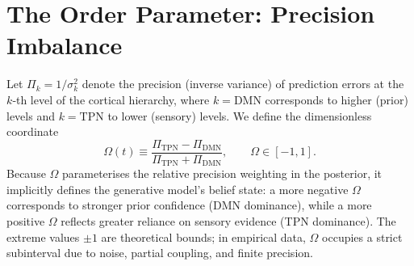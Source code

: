 \documentclass[11pt]{article}
\begin{document}
\section{The Order Parameter: Precision Imbalance}
Let $\Pi_k = 1/\sigma_k^2$ denote the precision (inverse variance) of prediction errors at the $k$‑th level of the cortical hierarchy, where $k=\text{DMN}$ corresponds to higher (prior) levels and $k=\text{TPN}$ to lower (sensory) levels. We define the dimensionless coordinate
\begin{equation}\label{eq:Omega}
\Omega(t) \equiv \frac{\Pi_{\text{TPN}} - \Pi_{\text{DMN}}}{\Pi_{\text{TPN}} + \Pi_{\text{DMN}}},
\qquad \Omega \in [-1,1].
\end{equation}
Because $\Omega$ parameterises the relative precision weighting in the posterior, it implicitly defines the generative model's belief state: a more negative $\Omega$ corresponds to stronger prior confidence (DMN dominance), while a more positive $\Omega$ reflects greater reliance on sensory evidence (TPN dominance). The extreme values $\pm 1$ are theoretical bounds; in empirical data, $\Omega$ occupies a strict subinterval due to noise, partial coupling, and finite precision.
\end{document}
